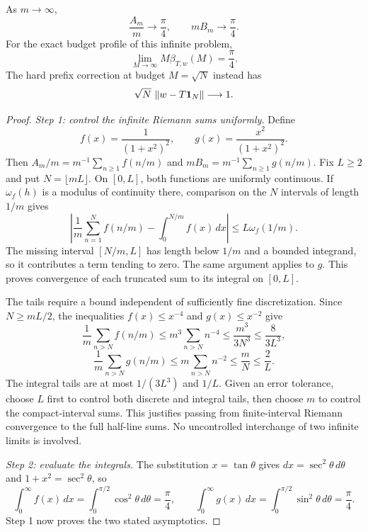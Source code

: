 \begin{KStheorem}\label{KS:WR11}
As $m\to\infty$,
\[
 \frac{A_m}{m}\longrightarrow\frac\pi4,\qquad
 mB_m\longrightarrow\frac\pi4.
\]
For the exact budget profile of this infinite problem,
\begin{equation}\label{KS:eq:sharp-budget}
 \lim_{M\to\infty}M\beta_{T,w}(M)=\frac\pi4.
\end{equation}
The hard prefix correction at budget $M=\sqrt N$ instead has
\[
 \sqrt N\,\left\lVert w-T\mathbf1_N\right\rVert\longrightarrow1.
\]
\end{KStheorem}
\begin{proof}
\emph{Step 1: control the infinite Riemann sums uniformly.} Define
\[
 f(x)=\frac1{(1+x^2)^2},\qquad
 g(x)=\frac{x^2}{(1+x^2)^2}.
\]
Then $A_m/m=m^{-1}\sum_{n\ge1}f(n/m)$ and $mB_m=m^{-1}\sum_{n\ge1}g(n/m)$. Fix $L\ge2$ and put $N=\lfloor mL\rfloor$. On $[0,L]$, both functions are uniformly continuous. If $\omega_f(h)$ is a modulus of continuity there, comparison on the $N$ intervals of length $1/m$ gives
\[
 \left|\frac1m\sum_{n=1}^N f(n/m)-\int_0^{N/m}f(x)\,dx\right|
 \le L\omega_f(1/m).
\]
The missing interval $[N/m,L]$ has length below $1/m$ and a bounded integrand, so it contributes a term tending to zero. The same argument applies to $g$. This proves convergence of each truncated sum to its integral on $[0,L]$.

The tails require a bound independent of sufficiently fine discretization. Since $N\ge mL/2$, the inequalities $f(x)\le x^{-4}$ and $g(x)\le x^{-2}$ give
\[
 \frac1m\sum_{n>N}f(n/m)
 \le m^3\sum_{n>N}n^{-4}\le\frac{m^3}{3N^3}
 \le\frac8{3L^3},
\]
\[
 \frac1m\sum_{n>N}g(n/m)
 \le m\sum_{n>N}n^{-2}\le\frac mN\le\frac2L.
\]
The integral tails are at most $1/(3L^3)$ and $1/L$. Given an error tolerance, choose $L$ first to control both discrete and integral tails, then choose $m$ to control the compact-interval sums. This justifies passing from finite-interval Riemann convergence to the full half-line sums. No uncontrolled interchange of two infinite limits is involved.

\emph{Step 2: evaluate the integrals.} The substitution $x=\tan\theta$ gives $dx=\sec^2\theta\,d\theta$ and $1+x^2=\sec^2\theta$, so
\[
 \int_0^\infty f(x)\,dx=\int_0^{\pi/2}\cos^2\theta\,d\theta=\frac\pi4,
 \qquad
 \int_0^\infty g(x)\,dx=\int_0^{\pi/2}\sin^2\theta\,d\theta=\frac\pi4.
\]
Step 1 now proves the two stated asymptotics.


\end{proof}
